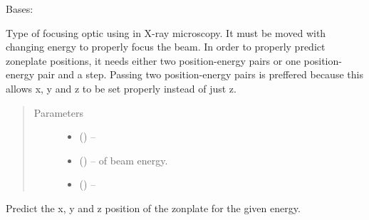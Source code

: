 \documentclass[letterpaper,10pt,english]{sphinxmanual}
\begin{document}

\begin{fulllineitems}
\label{\detokenize{xanespy:xanespy.beamlines.Zoneplate}}
Bases: 

Type of focusing optic using in X-ray microscopy. It must be moved
with changing energy to properly focus the beam. In order to
properly predict zoneplate positions, it needs either two
position-energy pairs or one position-energy pair and a
step. Passing two position-energy pairs is preffered because this
allows x, y and z to be set properly instead of just z.
\begin{quote}\begin{description}
\item[{Parameters}] \leavevmode\begin{itemize}
\item {} 
 (\sphinxstyleliteralemphasis{-}) -- 

\item {} 
 (\sphinxstyleliteralemphasis{-}) -- of beam energy.

\item {} 
 (\sphinxstyleliteralemphasis{-}) -- 

\end{itemize}

\end{description}\end{quote}

\begin{fulllineitems}
\label{\detokenize{xanespy:xanespy.beamlines.Zoneplate.position}}
Predict the x, y and z position of the zonplate for the given energy.

\end{fulllineitems}


\end{fulllineitems}

\end{document}
